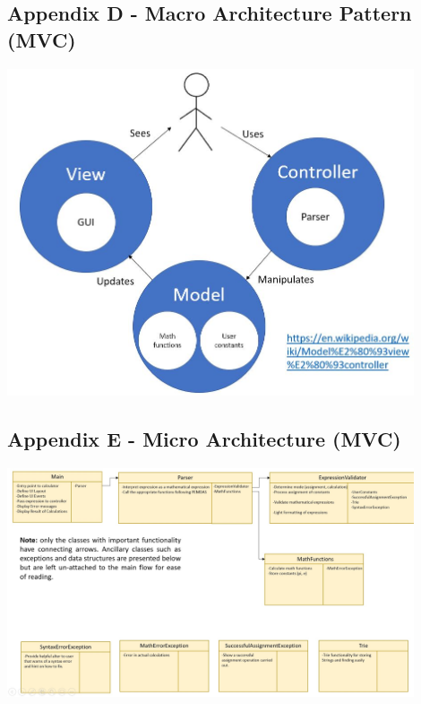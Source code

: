 \documentclass[a4paper, 12pt]{article}
\begin{document}
\pagebreak

\subsection{Appendix D - Macro Architecture Pattern (MVC)}

\begin{center}
\includegraphics[width=0.9\textwidth]{Pattern.jpg}
\end{center}

\pagebreak

\subsection{Appendix E - Micro Architecture (MVC)}

\begin{center}
\includegraphics[angle=90,width=0.9\textwidth]{CRC.jpg}
\end{center}

\pagebreak
\end{document}
